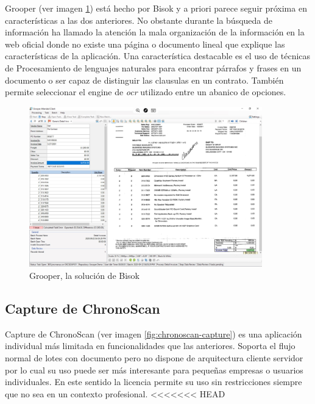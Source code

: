 Grooper \cite{solucionesComerciales_bisok_grooper} (ver imagen \ref{fig:grooper-bisok}) está hecho por Bisok y a priori parece seguir próxima en características a las dos anteriores. No obstante durante la búsqueda de información ha llamado la atención la mala organización de la información en la web oficial donde no existe una página o documento lineal que explique las características de la aplicación. Una característica destacable es el uso de técnicas de Procesamiento de lenguajes naturales para encontrar párrafos y frases en un documento o ser capaz de distinguir las clausulas en un contrato. También permite seleccionar el engine de \emph{\acrlong{ocr}} utilizado entre un abanico de opciones.

\begin{figure}[hp!]
    \centering
    \includegraphics[width=0.9\textwidth]{imaxes/b-estado-arte/bisok-grooper}
    \caption{Grooper, la solución de Bisok}
    \label{fig:grooper-bisok}
\end{figure}

\subsection{Capture de ChronoScan}

Capture de ChronoScan \cite{solucionesComerciales_chronoScanCapture_chronoScanDocumentCapture} (ver imagen \ref{fig:chronoscan-capture}) es una aplicación individual más limitada en funcionalidades que las anteriores. Soporta el flujo normal de lotes con documento pero no dispone de arquitectura cliente servidor por lo cual su uso puede ser más interesante para pequeñas empresas o usuarios individuales. En este sentido la licencia permite su uso sin restricciones siempre que no sea en un contexto profesional.
<<<<<<< HEAD


